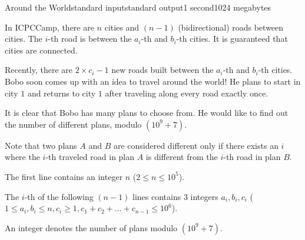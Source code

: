 \begin{problem}{Around the World}{standard input}{standard output}{1 second}{1024 megabytes}

In ICPCCamp, there are $n$ cities and $(n - 1)$ (bidirectional) roads between cities.
The $i$-th road is between the $a_i$-th and $b_i$-th cities.
It is guaranteed that cities are connected.

Recently, there are $2 \times c_i - 1$ new roads built between the $a_i$-th and $b_i$-th cities.
Bobo soon comes up with an idea to travel around the world! 
He plans to start in city $1$ and returns to city $1$ after traveling along every road exactly once.

It is clear that Bobo has many plans to choose from.
He would like to find out the number of different plans, modulo $(10^9+7)$.

Note that two plans $A$ and $B$ are considered different only if there exists an $i$ where the $i$-th traveled road in plan $A$ is different from the $i$-th road in plan $B$.


\InputFile
The first line contains an integer $n$ ($2 \leq n \leq 10^5$). 

The $i$-th of the following $(n - 1)$ lines contains $3$ integers $a_i, b_i, c_i$ ($1 \leq a_i, b_i \leq n, c_i \geq 1, c_1 + c_2 + \dots + c_{n - 1} \leq 10^6$). 

\OutputFile
An integer denotes the number of plans modulo $(10^9+7)$.

\Examples

\begin{example}
%
%
\end{example}

\end{problem}

